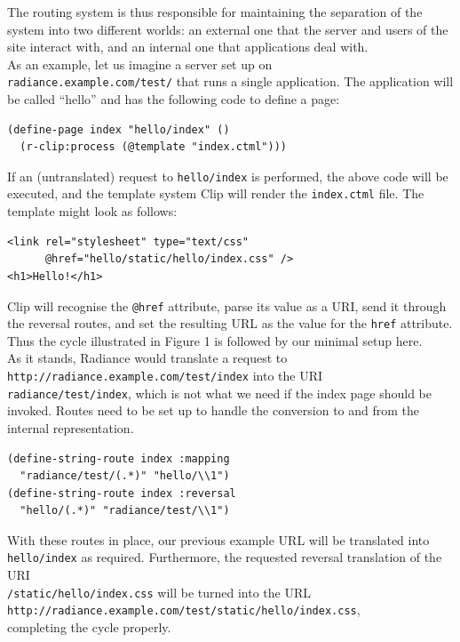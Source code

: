 \documentclass{sig-alternate}
\begin{document}
The routing system is thus responsible for maintaining the separation of the system into two different worlds: an external one that the server and users of the site interact with, and an internal one that applications deal with. \\

As an example, let us imagine a server set up on \\ \texttt{radiance.example.com/test/} that runs a single application. The application will be called ``hello'' and has the following code to define a page:

\begin{verbatim}
(define-page index "hello/index" ()
  (r-clip:process (@template "index.ctml")))
\end{verbatim}

If an (untranslated) request to \texttt{hello/index} is performed, the above code will be executed, and the template system Clip\cite{clip} will render the \texttt{index.ctml} file. The template might look as follows:

\begin{verbatim}
<link rel="stylesheet" type="text/css"
      @href="hello/static/hello/index.css" />
<h1>Hello!</h1>
\end{verbatim}

Clip will recognise the \texttt{@href} attribute, parse its value as a URI, send it through the reversal routes, and set the resulting URL as the value for the \texttt{href} attribute. Thus the cycle illustrated in Figure 1 is followed by our minimal setup here. \\

As it stands, Radiance would translate a request to \\\texttt{http://radiance.example.com/test/index} into the URI \\\texttt{radiance/test/index}, which is not what we need if the index page should be invoked. Routes need to be set up to handle the conversion to and from the internal representation.

\begin{verbatim}
(define-string-route index :mapping 
  "radiance/test/(.*)" "hello/\\1")
(define-string-route index :reversal
  "hello/(.*)" "radiance/test/\\1")
\end{verbatim}

With these routes in place, our previous example URL will be translated into \texttt{hello/index} as required. Furthermore, the requested reversal translation of the URI \\\texttt{/static/hello/index.css} will be turned into the URL \\\texttt{\small http://radiance.example.com/test/static/hello/index.css},\\ completing the cycle properly. \\
\end{document}

